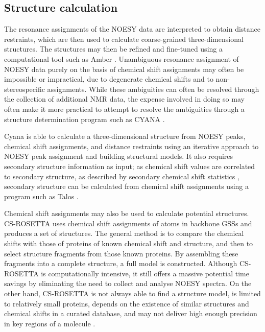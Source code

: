 \subsection{Structure calculation}
The resonance assignments of the NOESY data are 
interpreted to obtain distance restraints, which are then used to calculate 
coarse-grained three-dimensional structures.  The structures may then be 
refined and fine-tuned using a computational tool such as Amber \cite{amber}.  
Unambiguous resonance assignment of NOESY data purely on the basis of chemical 
shift assignments may often be impossible or impractical, due to degenerate 
chemical shifts and to non-stereospecific assignments.  While these 
ambiguities can often be resolved through the collection of additional 
NMR data, the expense involved in doing so may often make it more practical 
to attempt to resolve the ambiguities through a structure determination 
program such as CYANA \cite{cyana2004}.

Cyana is able to calculate a three-dimensional structure from NOESY peaks, 
chemical shift assignments, and distance restraints \cite{cyana2004, aria2003} 
using an iterative approach to NOESY peak assignment and building structural 
models.  It also requires secondary structure information as input; as
chemical shift values are correlated to secondary structure, as described
by secondary chemical shift statistics \cite{spera1991empirical}, secondary 
structure can be calculated from chemical shift assignments using a program 
such as Talos \cite{talos+}.  

Chemical shift assignments may also be used to calculate potential structures.
CS-ROSETTA \cite{cs-rosetta} uses chemical shift assignments of atoms in 
backbone GSSs and produces a set of structures.  The general method is to 
compare the chemical shifts with those of proteins of known chemical shift
and structure, and then to select structure fragments from those known 
proteins.  By assembling these fragments into a complete structure, a full
model is constructed.  Although CS-ROSETTA is computationally intensive, it
still offers a massive potential time savings by eliminating the need to
collect and analyse NOESY spectra.  On the other hand, CS-ROSETTA is not 
always able to find a structure model, is limited to relatively small 
proteins, depends on the existence of similar structures and chemical shifts
in a curated database, and may not deliver high enough precision in key 
regions of a molecule \cite{cs-rosetta}.

